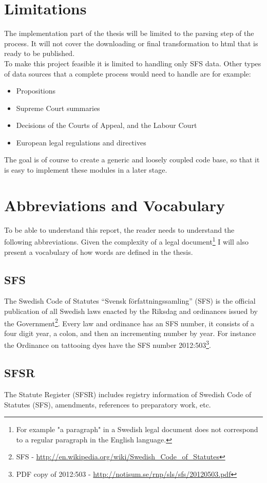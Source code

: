 \section{Limitations}
The implementation part of the thesis will be limited to the parsing step of the process. It will not cover the downloading or final transformation to html that is ready to be published.\\
To make this project feasible it is limited to handling only SFS data. Other types of data sources that a complete process would need to handle are for example: 
\begin{itemize}
\item Propositions
\item Supreme Court summaries
\item Decisions of the Courts of Appeal, and the Labour Court 
\item European legal regulations and directives
\end{itemize}
The goal is of course to create a generic and loosely coupled code base, so that it is easy to implement these 
modules in a later stage. 

\section{Abbreviations and Vocabulary} To be able to understand this report,
the reader needs to understand the following abbreviations. Given the
complexity of a legal document\footnote{For example "a paragraph" in a Swedish
legal document does not correspond to a regular paragraph in the English
language.} I will also present a vocabulary of how words are defined in the
thesis.

\subsection*{SFS} The Swedish Code of Statutes “Svensk författningssamling”
(SFS) is the official publication of all Swedish laws enacted by the Riksdag
and ordinances issued by the Government\footnote{SFS -
\url{http://en.wikipedia.org/wiki/Swedish_Code_of_Statutes}}. Every law and
ordinance has an SFS number, it consists of a four digit year, a colon, and
then an incrementing number by year. For instance the Ordinance on tattooing
dyes have the SFS number 2012:503\footnote{PDF copy of 2012:503 -
\url{http://notisum.se/rnp/sls/sfs/20120503.pdf}}.

\subsection*{SFSR}
The Statute Register (SFSR) includes registry information of Swedish Code
of Statutes (SFS), amendments, references to preparatory work, etc.


